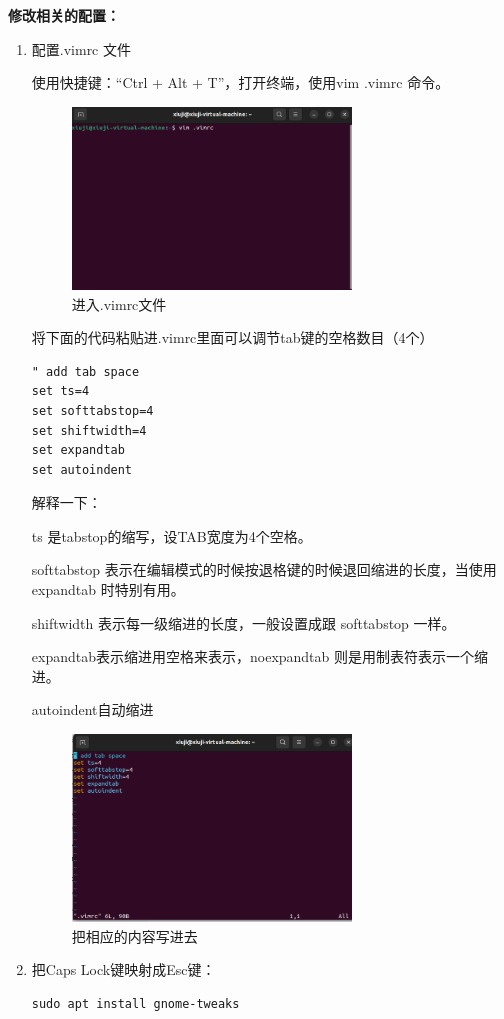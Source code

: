\documentclass[12pt]{article}
\begin{document}
\noindent \textbf{修改相关的配置：}
\begin{enumerate}
    \item 配置.vimrc 文件

使用快捷键：“Ctrl + Alt + T”，打开终端，使用vim .vimrc 命令。

\begin{figure}[h]
    \centering
    \includegraphics[width=0.7\textwidth]{img/.vimrc.png}
    \caption{进入.vimrc文件}
\end{figure}

将下面的代码粘贴进.vimrc里面可以调节tab键的空格数目（4个）

\begin{verbatim}
" add tab space
set ts=4
set softtabstop=4
set shiftwidth=4
set expandtab
set autoindent
\end{verbatim}

解释一下：

ts 是tabstop的缩写，设TAB宽度为4个空格。

softtabstop 表示在编辑模式的时候按退格键的时候退回缩进的长度，当使用 expandtab 时特别有用。

shiftwidth 表示每一级缩进的长度，一般设置成跟 softtabstop 一样。

expandtab表示缩进用空格来表示，noexpandtab 则是用制表符表示一个缩进。

autoindent自动缩进    

\begin{figure}[h]
    \centering
    \includegraphics[width=0.7\textwidth]{img/fixvim.png}
    \caption{把相应的内容写进去}
\end{figure}
\newpage
\item 把Caps Lock键映射成Esc键：
\begin{verbatim}
sudo apt install gnome-tweaks


\end{verbatim}
\end{enumerate}
\end{document}
